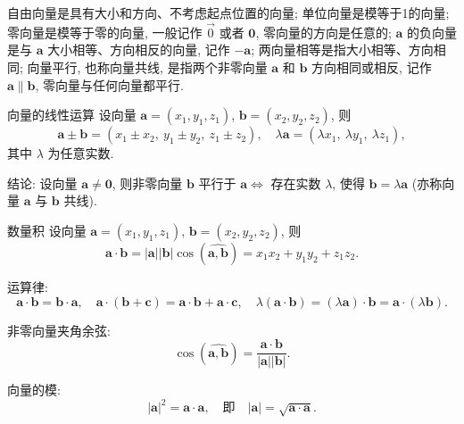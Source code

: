    \begin{zs}
 {自由向量是具有大小和方向、不考虑起点位置的向量; 单位向量是模等于1的向量; 零向量是模等于零的向量, 一般记作 $\vec{0}$ 或者 $\boldsymbol{0}$, 零向量的方向是任意的; $\boldsymbol{a}$ 的负向量是与 $\boldsymbol{a}$ 大小相等、方向相反的向量, 记作 $-\boldsymbol{a}$; 两向量相等是指大小相等、方向相同; 向量平行, 也称向量共线, 是指两个非零向量 $\boldsymbol{a}$ 和 $\boldsymbol{b}$ 方向相同或相反, 记作 $\boldsymbol{a} \parallel \boldsymbol{b}$, 零向量与任何向量都平行.}
        
    \end{zs}
    \begin{dl}{向量的线性运算}{}
设向量 $\boldsymbol{a} = (x_1,y_1,z_1)$, $\boldsymbol{b} = (x_2,y_2,z_2)$, 则
\[
\boldsymbol{a} \pm \boldsymbol{b} = (x_1 \pm x_2,\ y_1 \pm y_2,\ z_1 \pm z_2), \quad
\lambda\boldsymbol{a} = (\lambda x_1,\ \lambda y_1,\ \lambda z_1),
\]
其中 $\lambda$ 为任意实数.
\end{dl}
\begin{zs}
结论: 设向量 $\boldsymbol{a} \neq \boldsymbol{0}$, 则非零向量 $\boldsymbol{b}$ 平行于 $\boldsymbol{a} \Leftrightarrow$ 存在实数 $\lambda$, 使得 $\boldsymbol{b} = \lambda\boldsymbol{a}$ (亦称向量 $\boldsymbol{a}$ 与 $\boldsymbol{b}$ 共线).
\end{zs}
\begin{dl}{ 数量积}{}
设向量 $\boldsymbol{a} = (x_1,y_1,z_1)$, $\boldsymbol{b} = (x_2,y_2,z_2)$, 则
\[
\boldsymbol{a} \cdot \boldsymbol{b} = |\boldsymbol{a}||\boldsymbol{b}|\cos(\widehat{\boldsymbol{a},\boldsymbol{b}}) = x_1x_2 + y_1y_2 + z_1z_2.
\]
\end{dl}
 \begin{zs}
运算律:
\[
\boldsymbol{a} \cdot \boldsymbol{b} = \boldsymbol{b} \cdot \boldsymbol{a},\quad
\boldsymbol{a} \cdot (\boldsymbol{b} + \boldsymbol{c}) = \boldsymbol{a} \cdot \boldsymbol{b} + \boldsymbol{a} \cdot \boldsymbol{c},\quad
\lambda(\boldsymbol{a} \cdot \boldsymbol{b}) = (\lambda\boldsymbol{a}) \cdot \boldsymbol{b} = \boldsymbol{a} \cdot (\lambda\boldsymbol{b}).
\]
\end{zs}
 \begin{zs}
非零向量夹角余弦:
\[
\cos(\widehat{\boldsymbol{a},\boldsymbol{b}}) = \frac{\boldsymbol{a} \cdot \boldsymbol{b}}{|\boldsymbol{a}||\boldsymbol{b}|}.
\]
\end{zs}
 \begin{zs}
向量的模:
\[
|\boldsymbol{a}|^2 = \boldsymbol{a} \cdot \boldsymbol{a},\quad \text{即} \quad |\boldsymbol{a}| = \sqrt{\boldsymbol{a} \cdot \boldsymbol{a}}.
\]
\end{zs}
